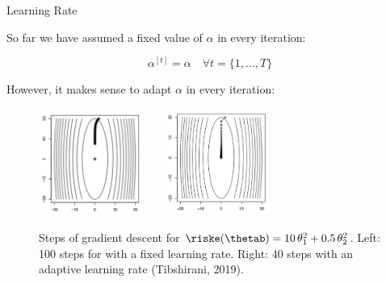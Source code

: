 
\begin{vbframe}{Learning Rate}


So far we have assumed a fixed value of $\alpha$ in every iteration:

\vspace*{-0.2cm}
$$\alpha^{[t]} = \alpha \quad \forall t = {\{1, \ldots, T\}}$$

%
%

However, it makes sense to adapt $\alpha$ in every iteration:


\vspace*{-0.1cm}
\begin{center}
\begin{figure}
\includegraphics[width = 0.3\textwidth]{figure/stepsize_small.png} ~~~ 
\includegraphics[width = 0.3\textwidth]{figure/stepsize_adaptive.png}
\caption{Steps of gradient descent for $\riske(\thetab) = 10\,\theta_1^2 + 0.5\,\theta_2^2$. Left:  100 steps for with a fixed learning rate. Right:  40 steps with an adaptive learning rate (Tibshirani, 2019).}
\end{figure}
\end{center}

\end{vbframe}

